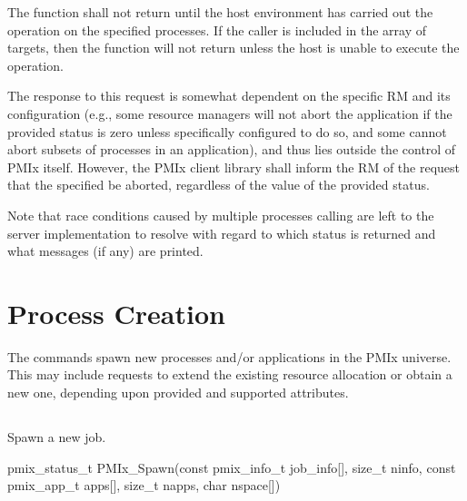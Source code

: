 The function shall not return until the host environment has carried out the operation on the specified processes. If the caller is included in the array of targets, then the function will not return unless the host is unable to execute the operation.

\adviceuserstart
The response to this request is somewhat dependent on the specific \acl{RM} and its configuration (e.g., some resource managers will not abort the application if the provided status is zero unless specifically configured to do so, and some cannot abort subsets of processes in an application), and thus lies outside the control of PMIx itself.
However, the PMIx client library shall inform the \ac{RM} of the request that the specified  be aborted, regardless of the value of the provided status.

Note that race conditions caused by multiple processes calling  are left to the server implementation to resolve with regard to which status is returned and what messages (if any) are printed.
\adviceuserend


\section{Process Creation}
\label{chap:api_proc_mgmt:spawn}

The  commands spawn new processes and/or applications in the \ac{PMIx} universe. This may include requests to extend the existing resource allocation or obtain a new one, depending upon provided and supported attributes.

\subsection{}

\summary

Spawn a new job.

\format

\cspecificstart
\begin{codepar}
pmix_status_t
PMIx_Spawn(const pmix_info_t job_info[], size_t ninfo,
           const pmix_app_t apps[], size_t napps,
           char nspace[])
\end{codepar}
\cspecificend

\begin{arglist}
\end{arglist}

